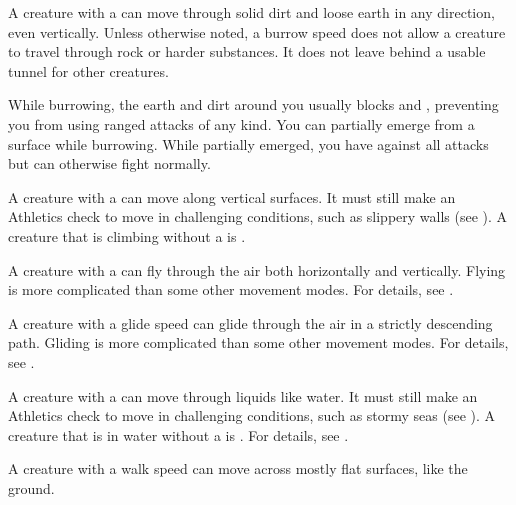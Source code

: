     A creature with a  can move through solid dirt and loose earth in any direction, even vertically.
    Unless otherwise noted, a burrow speed does not allow a creature to travel through rock or harder substances.
    It does not leave behind a usable tunnel for other creatures.

    While burrowing, the earth and dirt around you usually blocks  and , preventing you from using ranged attacks of any kind.
    You can partially emerge from a surface while burrowing.
    While partially emerged, you have  against all attacks but can otherwise fight normally.

    A creature with a  can move along vertical surfaces.
    It must still make an Athletics check to move in challenging conditions, such as slippery walls (see ).
    A creature that is climbing without a  is \unsteady.

    A creature with a  can fly through the air both horizontally and vertically.
    Flying is more complicated than some other movement modes.
    For details, see .

    A creature with a glide speed can glide through the air in a strictly descending path.
    Gliding is more complicated than some other movement modes.
    For details, see .

    A creature with a  can move through liquids like water.
    It must still make an Athletics check to move in challenging conditions, such as stormy seas (see ).
    A creature that is in water without a  is \unsteady.
    For details, see .

    A creature with a walk speed can move across mostly flat surfaces, like the ground.

